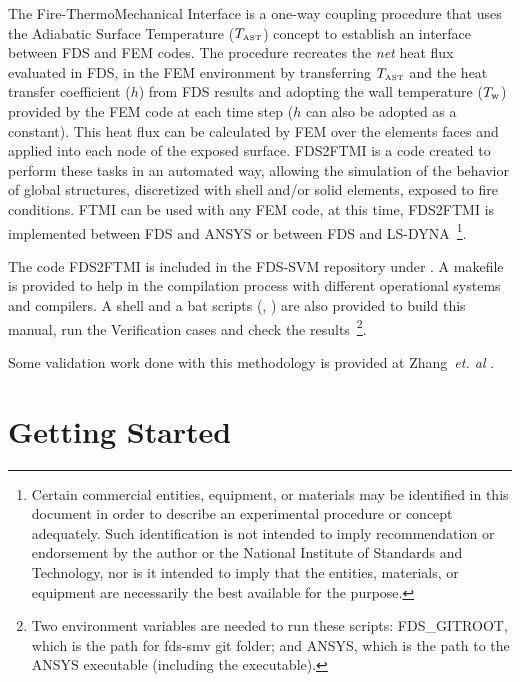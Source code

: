 \documentclass[11pt]{book}
\begin{document}
The Fire-ThermoMechanical Interface \cite{FTMI:Methodology} is a one-way coupling procedure that uses the Adiabatic Surface Temperature ($T_{\hbox{\tiny AST}}$) concept \cite{Wickstrom:Interflam2007,Wickstrom_AST} to establish an interface between FDS and FEM codes. The procedure recreates the {\em net} heat flux evaluated in FDS, in the FEM environment by transferring $T_{\hbox{\tiny AST}}$ and the heat transfer coefficient ($h$) from FDS results and adopting the wall temperature ($T_{\rm w}$) provided by the FEM code at each time step  ($h$ can also be adopted as a constant). This heat flux can be calculated by FEM over the elements faces and applied into each node of the exposed surface. FDS2FTMI is a code created to perform these tasks in an automated way, allowing the simulation of the behavior of global structures, discretized with shell and/or solid elements, exposed to fire conditions. FTMI can be used with any FEM code, at this time, FDS2FTMI is implemented between FDS and A{\footnotesize NSYS} or between FDS and LS-DYNA~\footnote{Certain commercial entities, equipment, or materials may be identified in this document in order to describe an experimental procedure or concept adequately. Such identification is not intended to imply recommendation or endorsement by the author or the National Institute of Standards and Technology, nor is it intended to imply that the entities, materials, or equipment are necessarily the best available for the purpose.}.

The code FDS2FTMI is included in the FDS-SVM repository \cite{FDS-SMV_repository} under . A makefile is provided to help in the compilation process with different operational systems and compilers. A shell and a bat scripts (, ) are also provided to build this manual, run the Verification cases and check the results~\footnote{Two environment variables are needed to run these scripts: FDS\_GITROOT, which is the path for fds-smv git folder; and ANSYS, which is the path to the ANSYS executable (including the executable).}.  

Some validation work done with this methodology is provided at Zhang~{\textit {et. al}} \cite{FTMI:Validation}.

\chapter{Getting Started}
\label{info:start}
\end{document}
